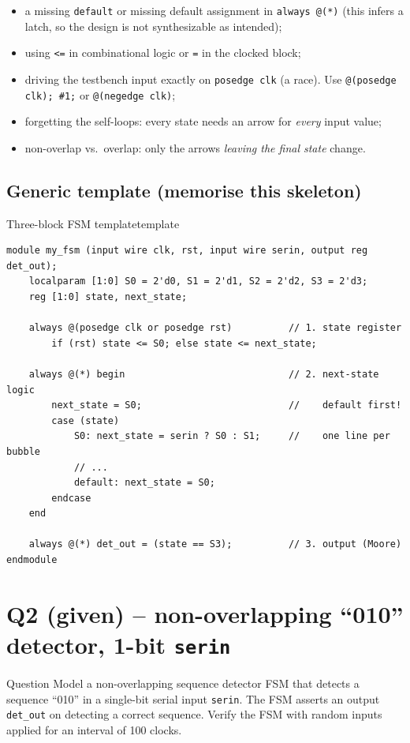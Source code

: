 \documentclass[10pt,a4paper]{article}
\begin{document}
\begin{tip}
\begin{itemize}[leftmargin=*,itemsep=0pt]
\item a missing \texttt{default} or missing default assignment in \texttt{always @(*)} (this infers a latch, so the design is not synthesizable as intended);
\item using \texttt{<=} in combinational logic or \texttt{=} in the clocked block;
\item driving the testbench input exactly on \texttt{posedge clk} (a race). Use \texttt{@(posedge clk); \#1;} or \texttt{@(negedge clk)};
\item forgetting the self-loops: every state needs an arrow for \emph{every} input value;
\item non-overlap vs.\ overlap: only the arrows \emph{leaving the final state} change.
\end{itemize}
\end{tip}

\subsection*{Generic template (memorise this skeleton)}
\begin{codeslice}{Three-block FSM template}{template}
\begin{lstlisting}
module my_fsm (input wire clk, rst, input wire serin, output reg det_out);
    localparam [1:0] S0 = 2'd0, S1 = 2'd1, S2 = 2'd2, S3 = 2'd3;
    reg [1:0] state, next_state;

    always @(posedge clk or posedge rst)          // 1. state register
        if (rst) state <= S0; else state <= next_state;

    always @(*) begin                             // 2. next-state logic
        next_state = S0;                          //    default first!
        case (state)
            S0: next_state = serin ? S0 : S1;     //    one line per bubble
            // ...
            default: next_state = S0;
        endcase
    end

    always @(*) det_out = (state == S3);          // 3. output (Moore)
endmodule
\end{lstlisting}
\end{codeslice}


\newpage
\section{Q2 (given) -- non-overlapping ``010'' detector, 1-bit \texttt{serin}}
\begin{qbox}{Question}
Model a non-overlapping sequence detector FSM that detects a sequence ``010'' in a single-bit serial input
\texttt{serin}. The FSM asserts an output \texttt{det\_out} on detecting a correct sequence. Verify the FSM
with random inputs applied for an interval of 100 clocks.
\end{qbox}
\end{document}
